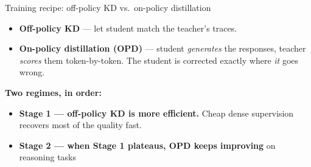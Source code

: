 \documentclass[9pt]{beamer}
\begin{document}
	\begin{frame}{Training recipe: off-policy KD vs.\ on-policy distillation}
		
		\begin{itemize}
			\item \textbf{Off-policy KD} --- let student match the teacher's traces. 
			\item \textbf{On-policy distillation (OPD)} --- student \emph{generates} the
			responses, teacher \emph{scores} them token-by-token. The student is
			corrected exactly where \emph{it} goes wrong.
		\end{itemize}
		
		\vspace{1em}
		\begin{mdframed}
			\textbf{Two regimes, in order:}
			\begin{itemize}
				\item \textbf{Stage 1 --- off-policy KD is more efficient.} Cheap dense
				supervision recovers most of the quality fast.
				\item \textbf{Stage 2 --- when Stage 1 plateaus, OPD keeps improving} on
				reasoning tasks
			\end{itemize}
		\end{mdframed}
		
	\end{frame}
	
\end{document}
